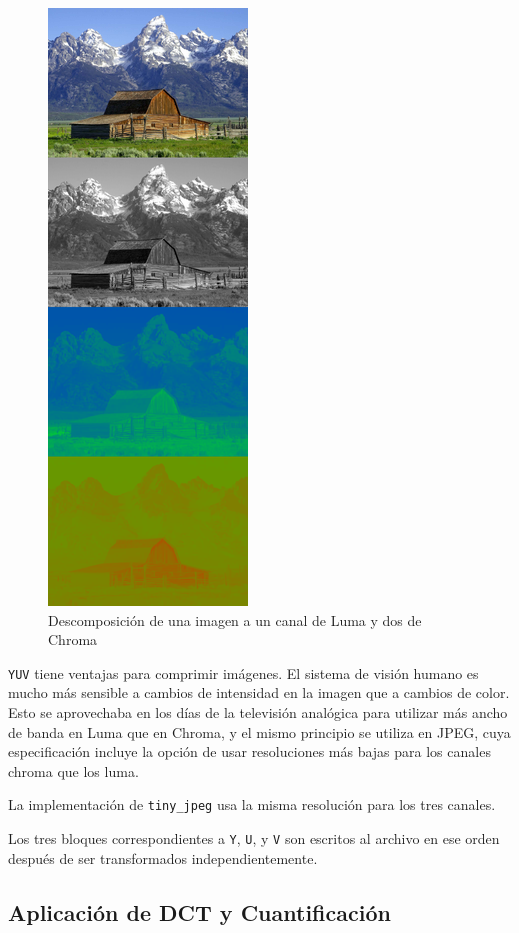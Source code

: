 \begin{figure}
    \includegraphics{yuv}
    \caption{Descomposición de una imagen a un canal de Luma y dos de Chroma}
\end{figure}

\verb+YUV+ tiene ventajas para comprimir imágenes. El sistema de visión humano
es mucho más sensible a cambios de intensidad en la imagen que a cambios de
color. Esto se aprovechaba en los días de la televisión analógica para utilizar
más ancho de banda en Luma que en Chroma, y el mismo principio se utiliza en
JPEG, cuya especificación incluye la opción de usar resoluciones más bajas para
los canales chroma que los luma.

La implementación de \verb+tiny_jpeg+ usa la misma resolución para los tres canales.

Los tres bloques correspondientes a \verb+Y+, \verb+U+, y \verb+V+ son escritos
al archivo en ese orden después de ser transformados independientemente.

\subsection{Aplicación de DCT y Cuantificación}\label{sub:vida_dct}

